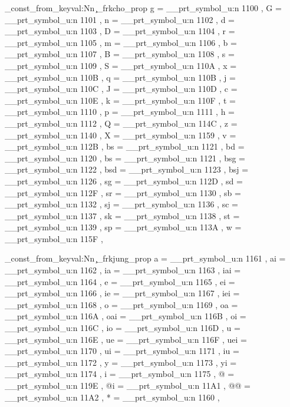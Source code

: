 \prop_const_from_keyval:Nn \c_frkcho_prop
{
	g 	= \__prt_symbol_u:n { 1100 },
	G 	= \__prt_symbol_u:n { 1101 },
	n	= \__prt_symbol_u:n { 1102 },
	d	= \__prt_symbol_u:n { 1103 },
	D	= \__prt_symbol_u:n { 1104 },
	r	= \__prt_symbol_u:n { 1105 },
	m	= \__prt_symbol_u:n { 1106 },
	b	= \__prt_symbol_u:n { 1107 },
	B	= \__prt_symbol_u:n { 1108 },
	s	= \__prt_symbol_u:n { 1109 },
	S	= \__prt_symbol_u:n { 110A },
	x	= \__prt_symbol_u:n { 110B },
	q	= \__prt_symbol_u:n { 110B },
	j	= \__prt_symbol_u:n { 110C },
	J	= \__prt_symbol_u:n { 110D },
	c	= \__prt_symbol_u:n { 110E },
	k	= \__prt_symbol_u:n { 110F },
	t	= \__prt_symbol_u:n { 1110 },
	p	= \__prt_symbol_u:n { 1111 },
	h	= \__prt_symbol_u:n { 1112 },
	Q	= \__prt_symbol_u:n { 114C },
	z	= \__prt_symbol_u:n { 1140 },
	X	= \__prt_symbol_u:n { 1159 },
	v	= \__prt_symbol_u:n { 112B },
	bs	= \__prt_symbol_u:n { 1121 },
	bd	= \__prt_symbol_u:n { 1120 },
	bs	= \__prt_symbol_u:n { 1121 },
	bsg	= \__prt_symbol_u:n { 1122 },
	bsd	= \__prt_symbol_u:n { 1123 },
	bsj	= \__prt_symbol_u:n { 1126 },
	sg	= \__prt_symbol_u:n { 112D },
	sd	= \__prt_symbol_u:n { 112F },
	sr	= \__prt_symbol_u:n { 1130 },
	sb	= \__prt_symbol_u:n { 1132 },
	sj	= \__prt_symbol_u:n { 1136 },
	sc	= \__prt_symbol_u:n { 1137 },
	sk	= \__prt_symbol_u:n { 1138 },
	st	= \__prt_symbol_u:n { 1139 },
	sp	= \__prt_symbol_u:n { 113A },
	w 	= \__prt_symbol_u:n { 115F },
}

\prop_const_from_keyval:Nn \c_frkjung_prop
{
	a	= \__prt_symbol_u:n { 1161 },
	ai	= \__prt_symbol_u:n { 1162 },
	ia	= \__prt_symbol_u:n { 1163 },
	iai	= \__prt_symbol_u:n { 1164 },
	e	= \__prt_symbol_u:n { 1165 },
	ei	= \__prt_symbol_u:n { 1166 },
	ie	= \__prt_symbol_u:n { 1167 },
	iei	= \__prt_symbol_u:n { 1168 },
	o	= \__prt_symbol_u:n { 1169 },
	oa	= \__prt_symbol_u:n { 116A },
	oai	= \__prt_symbol_u:n { 116B },
	oi	= \__prt_symbol_u:n { 116C },
	io	= \__prt_symbol_u:n { 116D },
	u	= \__prt_symbol_u:n { 116E },
	ue	= \__prt_symbol_u:n { 116F },
	uei	= \__prt_symbol_u:n { 1170 },
	ui	= \__prt_symbol_u:n { 1171 },
	iu	= \__prt_symbol_u:n { 1172 },
	y	= \__prt_symbol_u:n { 1173 },
	yi	= \__prt_symbol_u:n { 1174 },
	i	= \__prt_symbol_u:n { 1175 },
	@	= \__prt_symbol_u:n { 119E },
	@i	= \__prt_symbol_u:n { 11A1 },
	@@	= \__prt_symbol_u:n { 11A2 },
	*	= \__prt_symbol_u:n { 1160 },
}

